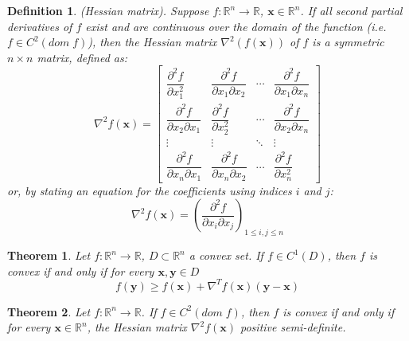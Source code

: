 \documentclass[12pt]{report}
\newtheorem{defn}{Definition}[section]
\newtheorem{thm}{Theorem}[section]
\numberwithin{equation}{section}
\begin{document}
\begin{defn}
\normalfont
(Hessian matrix).
Suppose $f:\mathbb{R}^n\rightarrow\mathbb{R}$, $\bm{x}\in\mathbb{R}^n$. If all second partial derivatives of $f$ exist and are continuous over the domain of the function (i.e. $f\in C^2(dom\; f)$), then the Hessian matrix $\nabla^2(f(\bm{x}))$ of $f$ is a symmetric $n\times n$ matrix, defined as:
\begin{equation}
\nabla^2 f(\bm{x})=\left[\begin{array}{cccc}
{\dfrac{\partial^{2} f}{\partial x_{1}^{2}}} & {\dfrac{\partial^{2} f}{\partial x_{1} \partial x_{2}}} & {\cdots} & {\dfrac{\partial^{2} f}{\partial x_{1} \partial x_{n}}} \\
 {\dfrac{\partial^{2} f}{\partial x_{2} \partial x_{1}}} & {\dfrac{\partial^{2} f}{\partial x_{2}^{2}}} & {\cdots} & {\dfrac{\partial^{2} f}{\partial x_{2} \partial x_{n}}} \\
  {\vdots} & {\vdots} & {\ddots} & {\vdots} \\ {\dfrac{\partial^{2} f}{\partial x_{n} \partial x_{1}}} & {\dfrac{\partial^{2} f}{\partial x_{n} \partial x_{2}}} & {\cdots} & {\dfrac{\partial^{2} f}{\partial x_{n}^{2}}}\end{array}\right]
\end{equation}
or, by stating an equation for the coefficients using indices $i$ and $j$:
\begin{equation}
\nabla^2 f(\bm{x}) = \left(\frac{\partial^{2} f}{\partial x_{i} \partial x_{j}}\right)_{1 \leq i, j \leq n}
\end{equation}
\end{defn}
\begin{thm}\label{thm:first_order}
Let $f:\mathbb{R}^n\rightarrow \mathbb{R}$, $D \subset \mathbb{R}^n$ a convex set. If $f\in C^1(D)$, then $f$ is convex if and only if for every $\bm{x},\bm{y} \in D$
\begin{equation}
f(\bm{y})  \geq  f(\bm{x}) + \nabla^T f(\bm{x}) (\bm{y}-\bm{x}) 
\end{equation}
\end{thm}
\begin{thm}\label{thm:second_order}
Let $f:\mathbb{R}^n\rightarrow \mathbb{R}$. If $f\in C^2(dom \; f)$, then $f$ is convex if and only if for every $\bm{x}\in\mathbb{R}^n$, the Hessian matrix $\nabla^2 f(\bm{x})$ positive semi-definite.
\end{thm}
\end{document}
